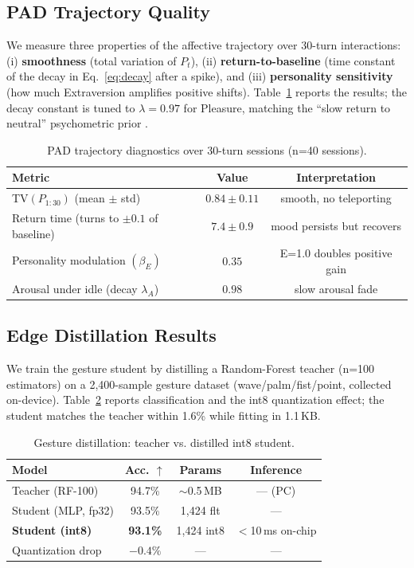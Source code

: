 \documentclass{article}
\theoremstyle{definition}
\begin{document}
\subsection{PAD Trajectory Quality}

We measure three properties of the affective trajectory over 30-turn
interactions: (i) \textbf{smoothness} (total variation of $P_t$),
(ii) \textbf{return-to-baseline} (time constant of the decay in
Eq.~\eqref{eq:decay} after a spike), and (iii) \textbf{personality sensitivity}
(how much Extraversion amplifies positive shifts). Table~\ref{tab:traj} reports
the results; the decay constant is tuned to $\lambda = 0.97$ for Pleasure,
matching the ``slow return to neutral'' psychometric prior
\cite{verduyn2011time}.

\begin{table}[t]
\centering
\small
\begin{tabular}{lcc}
\toprule
\textbf{Metric} & \textbf{Value} & \textbf{Interpretation} \\
\midrule
TV$(P_{1:30})$ (mean $\pm$ std) & $0.84 \pm 0.11$ & smooth, no teleporting \\
Return time (turns to $\pm0.1$ of baseline) & $7.4 \pm 0.9$ & mood persists but recovers \\
Personality modulation $(\beta_E)$ & $0.35$ & E=1.0 doubles positive gain \\
Arousal under idle (decay $\lambda_A$) & $0.98$ & slow arousal fade \\
\bottomrule
\end{tabular}
\caption{PAD trajectory diagnostics over 30-turn sessions (n=40 sessions).}
\label{tab:traj}
\end{table}

\subsection{Edge Distillation Results}

We train the gesture student by distilling a Random-Forest teacher
(n=100 estimators) on a 2,400-sample gesture dataset (wave/palm/fist/point,
collected on-device). Table~\ref{tab:gesture} reports classification and the
int8 quantization effect; the student matches the teacher within 1.6\% while
fitting in 1.1\,KB.

\begin{table}[t]
\centering
\small
\begin{tabular}{lccc}
\toprule
\textbf{Model} & \textbf{Acc. $\uparrow$} & \textbf{Params} & \textbf{Inference} \\
\midrule
Teacher (RF-100)            & 94.7\% & $\sim$0.5\,MB & --- (PC) \\
Student (MLP, fp32)         & 93.5\% & 1,424 flt  & --- \\
\textbf{Student (int8)}     & \textbf{93.1\%} & 1,424 int8 & $<$10\,ms on-chip \\
\midrule
Quantization drop           & $-0.4\%$ & --- & --- \\
\bottomrule
\end{tabular}
\caption{Gesture distillation: teacher vs. distilled int8 student.}
\label{tab:gesture}
\end{table}
\end{document}
